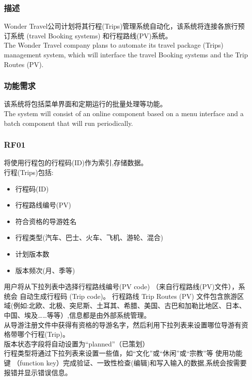 \hypertarget{ux63a5ux4e58ux5ba2}{%
\subsubsection{描述}\label{ux63a5ux4e58ux5ba2}}

Wonder Travel公司计划将其行程(Trips)管理系统自动化，该系统将连接各旅行预订系统 (travel Booking systems) 和行程路线(PV)系统。\\
The Wonder Travel company plans to automate its travel package (Trips) management system, which will interface the travel Booking systems and the Trip Routes (PV).\\

\hypertarget{ux63a5ux4e58ux5ba2}{%
\subsubsection{功能需求}\label{ux63a5ux4e58ux5ba2}}

该系统将包括菜单界面和定期运行的批量处理等功能。\\
The system will consist of an online component based on a menu interface and a batch component that will run periodically. \\

\hypertarget{ux63a5ux4e58ux5ba2}{%
\subsubsection{RF01}\label{ux63a5ux4e58ux5ba2}}

将使用行程包的行程码(ID)作为索引,存储数据。\\
行程(Trips)包括: \\

\begin{itemize}
\tightlist
\item
  行程码(ID)
\item
  行程路线编号(PV)
\item
  符合资格的导游姓名
\item
  行程类型(汽车、巴士、火车、飞机、游轮、混合)
\item
  计划版本数
\item
  版本频次(月、季等)
\end{itemize}

用户将从下拉列表中选择行程路线编号(PV code) （来自行程路线(PV)文件），系统会 自动生成行程码 (Trip code)。 行程路线 Trip Routes (PV) 文件包含旅游区域(例如:北欧、北极、突尼斯、土耳其、希腊、美国、古巴和加勒比地区、日本、中国、埃及……等等）,信息都是由外部系统管理。\\
从导游注册文件中获得有资格的导游名字，然后利用下拉列表来设置哪位导游有资格带哪个行程(Trip)。\\
版本状态字段将自动设置为“planned”（已策划）\\
行程类型将通过下拉列表来设置一些值，如“文化”或“休闲”或“宗教”等 使用功能键 （function key）完成验证、一致性检查(编辑)和写入输入的数据,系统会按需要报错并显示错误信息。\\


